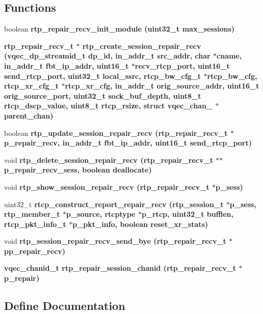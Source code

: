 \subsection*{Functions}
\begin{CompactItemize}
\item 
boolean \bf{rtp\_\-repair\_\-recv\_\-init\_\-module} (uint32\_\-t max\_\-sessions)
\item 
\bf{rtp\_\-repair\_\-recv\_\-t} $\ast$ \bf{rtp\_\-create\_\-session\_\-repair\_\-recv} (vqec\_\-dp\_\-streamid\_\-t dp\_\-id, in\_\-addr\_\-t src\_\-addr, char $\ast$cname, in\_\-addr\_\-t fbt\_\-ip\_\-addr, uint16\_\-t $\ast$recv\_\-rtcp\_\-port, uint16\_\-t send\_\-rtcp\_\-port, uint32\_\-t local\_\-ssrc, rtcp\_\-bw\_\-cfg\_\-t $\ast$rtcp\_\-bw\_\-cfg, rtcp\_\-xr\_\-cfg\_\-t $\ast$rtcp\_\-xr\_\-cfg, in\_\-addr\_\-t orig\_\-source\_\-addr, uint16\_\-t orig\_\-source\_\-port, uint32\_\-t sock\_\-buf\_\-depth, uint8\_\-t rtcp\_\-dscp\_\-value, uint8\_\-t rtcp\_\-rsize, struct \bf{vqec\_\-chan\_\-} $\ast$parent\_\-chan)
\item 
boolean \bf{rtp\_\-update\_\-session\_\-repair\_\-recv} (\bf{rtp\_\-repair\_\-recv\_\-t} $\ast$p\_\-repair\_\-recv, in\_\-addr\_\-t fbt\_\-ip\_\-addr, uint16\_\-t send\_\-rtcp\_\-port)
\item 
void \bf{rtp\_\-delete\_\-session\_\-repair\_\-recv} (\bf{rtp\_\-repair\_\-recv\_\-t} $\ast$$\ast$p\_\-repair\_\-recv\_\-sess, boolean deallocate)
\item 
void \bf{rtp\_\-show\_\-session\_\-repair\_\-recv} (\bf{rtp\_\-repair\_\-recv\_\-t} $\ast$p\_\-sess)
\item 
uint32\_\-t \bf{rtcp\_\-construct\_\-report\_\-repair\_\-recv} (rtp\_\-session\_\-t $\ast$p\_\-sess, rtp\_\-member\_\-t $\ast$p\_\-source, rtcptype $\ast$p\_\-rtcp, uint32\_\-t bufflen, rtcp\_\-pkt\_\-info\_\-t $\ast$p\_\-pkt\_\-info, boolean reset\_\-xr\_\-stats)
\item 
void \bf{rtp\_\-session\_\-repair\_\-recv\_\-send\_\-bye} (\bf{rtp\_\-repair\_\-recv\_\-t} $\ast$pp\_\-repair\_\-recv)
\item 
\bf{vqec\_\-chanid\_\-t} \bf{rtp\_\-repair\_\-session\_\-chanid} (\bf{rtp\_\-repair\_\-recv\_\-t} $\ast$p\_\-repair)
\end{CompactItemize}


\subsection{Define Documentation}
